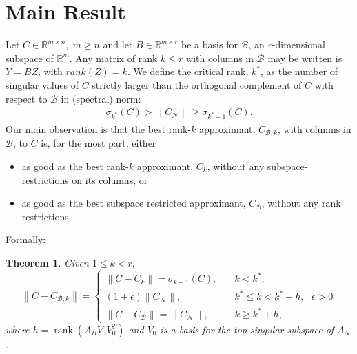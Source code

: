 \documentclass[11pt]{article}
\newcommand{\rank}{\operatorname{rank}}
\newtheorem{theorem}{Theorem}
\renewcommand{\math}[1]{$#1$}
\def\reals{\mathbb{R}}
\newcommand{\norm}[1]{\left\|#1\right\|}
\newcommand{\B}{\mathcal{B}}
\newcommand{\N}{\mathcal{N}}
\begin{document}
\section{Main Result}
Let $C \in \reals^{m \times n}, \; m \geq n$ and let $B \in \reals^{m \times r}$ be a basis for $\B$, an $r$-dimensional subspace of $\reals^m$. Any matrix of rank $k \leq r$ with columns in $\B$ may be written is $Y = BZ$, with $rank(Z) = k$. We define the critical rank, $k^*$, as the number of singular values of $C$ strictly larger than the orthogonal complement of $C$ with respect to $\B$ in (spectral) norm:
\begin{eqnarray}\label{critical rank inequality}
\sigma_{k^*}(C) > \norm{C_{\N}} \geq \sigma_{k^*+1}(C).
\end{eqnarray}
Our main observation is that the best rank-$k$ approximant, $C_{\B, k}$, with columns in $\B$, to $C$ is, for the most part, either
\begin{itemize}
\item as good as the best rank-$k$ approximant, $C_k$, without any subspace-restrictions on its columns, or
\item as good as the best subspace restricted approximant, $C_{\B}$, without any rank restrictions.
\end{itemize}
Formally:
\begin{theorem}\label{main theorem}
Given $1 \leq k < r,$
\[ \norm{C - C_{\B,k}} = \left\{ \begin{array}{ll} \norm{C - C_k} = \sigma_{k+1}(C), & \quad k < k^*,\\[5 pt] (1+\epsilon)\norm{C_{\N}}, & \quad k^* \leq k < k^*+h, \text{ }\epsilon > 0 \\[5 pt] 
\norm{C - C_{\B}} = \norm{C_{\N}}, & \quad k \geq k^*+h,  \end{array} \right. \]
where $h=\rank(A_BV_0V_0^T)$ 
and \math{V_0} is a basis for the top singular subspace of $A_N$.
\end{theorem}
\end{document}
